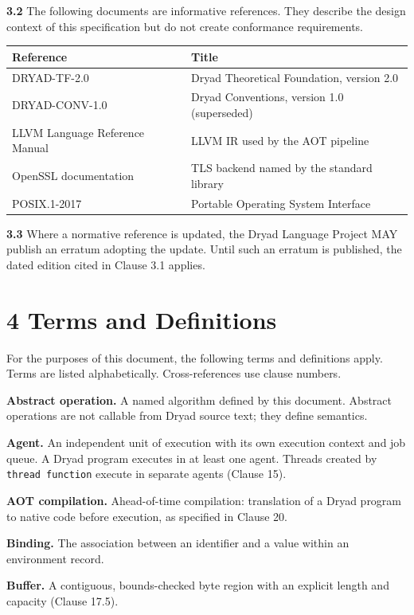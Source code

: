 \documentclass[
  english,
  11pt,
  a4paper,
]{article}
\begin{document}
\textbf{3.2} The following documents are informative references. They
describe the design context of this specification but do not create
conformance requirements.

\begin{longtable}[]{@{}ll@{}}
\toprule\noalign{}
Reference & Title \\
\midrule\noalign{}
\endhead
\bottomrule\noalign{}
\endlastfoot
DRYAD-TF-2.0 & Dryad Theoretical Foundation, version 2.0 \\
DRYAD-CONV-1.0 & Dryad Conventions, version 1.0 (superseded) \\
LLVM Language Reference Manual & LLVM IR used by the AOT pipeline \\
OpenSSL documentation & TLS backend named by the standard library \\
POSIX.1-2017 & Portable Operating System Interface \\
\end{longtable}

\textbf{3.3} Where a normative reference is updated, the Dryad Language
Project MAY publish an erratum adopting the update. Until such an
erratum is published, the dated edition cited in Clause 3.1 applies.

\section{4 Terms and Definitions}\label{terms-and-definitions}

For the purposes of this document, the following terms and definitions
apply. Terms are listed alphabetically. Cross-references use clause
numbers.

\textbf{Abstract operation.} A named algorithm defined by this document.
Abstract operations are not callable from Dryad source text; they define
semantics.

\textbf{Agent.} An independent unit of execution with its own execution
context and job queue. A Dryad program executes in at least one agent.
Threads created by \texttt{thread\ function} execute in separate agents
(Clause 15).

\textbf{AOT compilation.} Ahead-of-time compilation: translation of a
Dryad program to native code before execution, as specified in Clause
20.

\textbf{Binding.} The association between an identifier and a value
within an environment record.

\textbf{Buffer.} A contiguous, bounds-checked byte region with an
explicit length and capacity (Clause 17.5).
\end{document}
